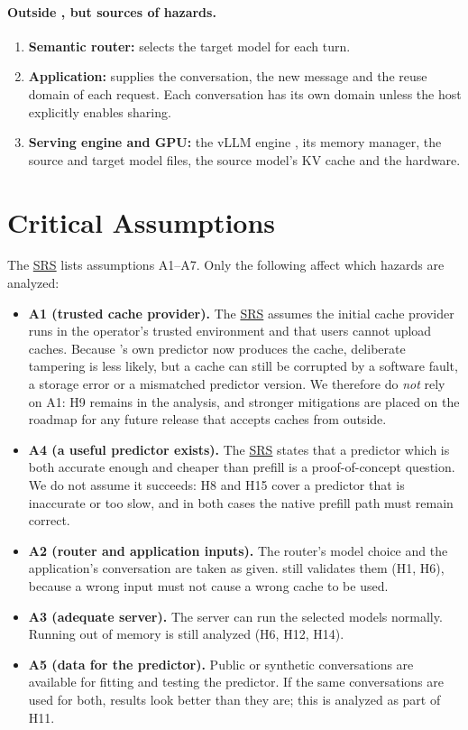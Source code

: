 \documentclass{article}
\newcommand{\srs}{\href{https://tandemkv.github.io/Tandem/SRS-Volere/SRS.pdf}{SRS}}
\begin{document}
\paragraph{Outside \progname{}, but sources of hazards.}
\begin{enumerate}[resume*]
  \item \label{comp:router} \textbf{Semantic router:} selects the target
  model for each turn.
  \item \label{comp:app} \textbf{Application:} supplies the conversation,
  the new message and the reuse domain of each request. Each conversation has
  its own domain unless the host explicitly enables sharing.
  \item \label{comp:engine} \textbf{Serving engine and GPU:} the vLLM
  engine \cite{Kwon2023vLLM}, its memory manager, the source and target
  model files, the source model's KV cache and the hardware.
\end{enumerate}

\section{Critical Assumptions}
\label{sec:assumptions}

The \srs{} lists assumptions A1--A7. Only the following affect which
hazards are analyzed:

\begin{itemize}
  \item \textbf{A1 (trusted cache provider).} The \srs{} assumes the
  initial cache provider runs in the operator's trusted environment and
  that users cannot upload caches. Because \progname{}'s own predictor now
  produces the cache, deliberate tampering is less likely, but a cache can
  still be corrupted by a software fault, a storage error or a mismatched
  predictor version. We therefore do \emph{not} rely on A1: H9 remains in
  the analysis, and stronger mitigations are placed on the roadmap for any
  future release that accepts caches from outside.
  \item \textbf{A4 (a useful predictor exists).} The \srs{} states that a
  predictor which is both accurate enough and cheaper than prefill is a
  proof-of-concept question. We do not assume it succeeds: H8 and H15
  cover a predictor that is inaccurate or too slow, and in both cases the
  native prefill path must remain correct.
  \item \textbf{A2 (router and application inputs).} The router's model
  choice and the application's conversation are taken as given. \progname{}
  still validates them (H1, H6), because a wrong input must not cause a
  wrong cache to be used.
  \item \textbf{A3 (adequate server).} The server can run the selected
  models normally. Running out of memory is still analyzed (H6, H12, H14).
  \item \textbf{A5 (data for the predictor).} Public or synthetic
  conversations are available for fitting and testing the predictor. If
  the same conversations are used for both, results look better than they
  are; this is analyzed as part of H11.
\end{itemize}
\end{document}
